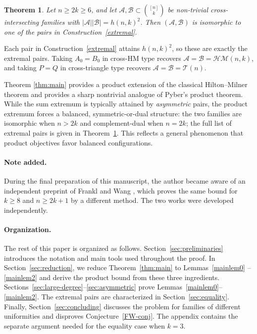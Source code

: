 \documentclass[a4paper,11pt]{article}
\newtheorem{theorem}{Theorem}[section]
\newcommand{\m}{\mathcal}
\begin{document}
\begin{theorem}\label{thm:equality}
Let $n\ge 2k\ge 6$, and let
$\m A,\m B\subset\binom{[n]}{k}$ be non-trivial
cross-intersecting families with $|\m A||\m B|=h(n,k)^2$.
Then $(\m A,\m B)$ is isomorphic to one of the pairs in
Construction~\ref{extremal}.
\end{theorem}

\begin{remark}
Each pair in Construction~\ref{extremal} attains
$h(n,k)^2$, so these are exactly the extremal pairs.
Taking $A_0=B_0$ in cross-HM type recovers
$\m A=\m B=\m{HM}(n,k)$, and taking $P=Q$ in cross-triangle type recovers $\m A=\m B=\m{T}(n)$. 
\end{remark}


Theorem \ref{thm:main}  provides a product extension of the classical Hilton--Milner theorem and provides a sharp nontrivial analogue of Pyber’s product theorem. 
While the sum extremum is typically attained by \emph{asymmetric}
pairs, the product extremum forces a balanced,
symmetric-or-dual structure: the two families are isomorphic  when
$n>2k$ and complement-dual when $n=2k$; the full list of extremal pairs is
given in Theorem~\ref{thm:equality}. This reflects a general
phenomenon that product objectives favor balanced configurations.

\paragraph{Note added.}
During the final preparation of this manuscript, the author became
aware of an independent preprint of Frankl and Wang
\cite{FW2026},  
which proves the same bound
for $k\ge8$ and $n\ge2k+1$ by a different method. The two works were
developed independently.

\paragraph{Organization.}
The rest of this paper is organized as follows. 
Section~\ref{sec:preliminaries} introduces the notation and main tools used throughout the proof. 
In Section~\ref{sec:reduction}, we reduce Theorem~\ref{thm:main} to
Lemmas~\ref{mainlem0} -- \ref{mainlem2} and derive the product bound from
these three ingredients. 
Sections~\ref{sec:large-degree}--\ref{sec:asymmetric} prove 
Lemmas~\ref{mainlem0}--\ref{mainlem2}. 
The extremal pairs are characterized in Section~\ref{sec:equality}. Finally, 
Section~\ref{sec:concluding} discusses the problem for families of
different uniformities and disproves Conjecture~\ref{FW-conj}. The appendix contains the separate argument
needed for the equality case when $k=3$.
\end{document}
